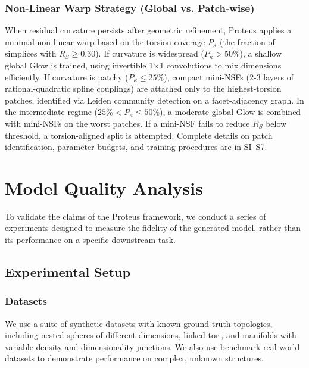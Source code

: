 \documentclass[11pt]{article}
\begin{document}
\subsubsection{Non-Linear Warp Strategy (Global vs. Patch-wise)}
When residual curvature persists after geometric refinement, Proteus applies a minimal non-linear warp based on the torsion coverage $P_\kappa$ (the fraction of simplices with $R_S \ge 0.30$). If curvature is widespread ($P_\kappa > 50\%$), a shallow global Glow is trained, using invertible 1$\times$1 convolutions to mix dimensions efficiently. If curvature is patchy ($P_\kappa \le 25\%$), compact mini-NSFs (2-3 layers of rational-quadratic spline couplings) are attached only to the highest-torsion patches, identified via Leiden community detection on a facet-adjacency graph. In the intermediate regime ($25\% < P_\kappa \le 50\%$), a moderate global Glow is combined with mini-NSFs on the worst patches. If a mini-NSF fails to reduce $R_S$ below threshold, a torsion-aligned split is attempted. Complete details on patch identification, parameter budgets, and training procedures are in SI~S7.




\section{Model Quality Analysis}
\label{sec:model-quality}

To validate the claims of the Proteus framework, we conduct a series of experiments designed to measure the fidelity of the generated model, rather than its performance on a specific downstream task.

\subsection{Experimental Setup}
\subsubsection{Datasets}
We use a suite of synthetic datasets with known ground-truth topologies, including nested spheres of different dimensions, linked tori, and manifolds with variable density and dimensionality junctions. We also use benchmark real-world datasets to demonstrate performance on complex, unknown structures.
\end{document}
